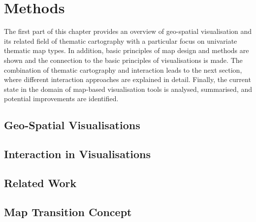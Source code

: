 \section{Methods}
\label{s:methods}
The first part of this chapter provides an overview of geo-spatial visualisation and its related field of thematic cartography with a particular focus on univariate thematic map types. In addition, basic principles of map design and methods are shown and the connection to the basic principles of visualisations is made. The combination of thematic cartography and interaction leads to the next section, where different interaction approaches are explained in detail. Finally, the current state in the domain of map-based visualisation tools is analysed, summarised, and potential improvements are identified.

\subsection{Geo-Spatial Visualisations}
\label{s:cartography}


\subsection{Interaction in Visualisations}
\label{s:interaction}


\newpage
\subsection{Related Work}


\subsection{Map Transition Concept}
\label{s:theoretical-contrib}
